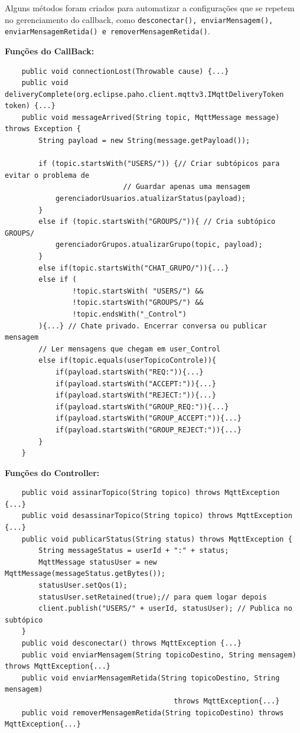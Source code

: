 \documentclass{report}
\begin{document}
Alguns métodos foram criados para automatizar a configurações que se repetem no gerenciamento do callback, como \texttt{desconectar(), enviarMensagem(), enviarMensagemRetida() e removerMensagemRetida()}.

\textbf{Funções do CallBack:}
\begin{verbatim}
	public void connectionLost(Throwable cause) {...}
	public void deliveryComplete(org.eclipse.paho.client.mqttv3.IMqttDeliveryToken token) {...}
	public void messageArrived(String topic, MqttMessage message) throws Exception {
		String payload = new String(message.getPayload());

		if (topic.startsWith("USERS/")) {// Criar subtópicos para evitar o problema de
							// Guardar apenas uma mensagem
			gerenciadorUsuarios.atualizarStatus(payload);
		}
		else if (topic.startsWith("GROUPS/")){ // Cria subtópico GROUPS/
			gerenciadorGrupos.atualizarGrupo(topic, payload);
		}
		else if(topic.startsWith("CHAT_GRUPO/")){...}
		else if (
				!topic.startsWith( "USERS/") && 
				!topic.startsWith("GROUPS/") &&
				!topic.endsWith("_Control")
		){...} // Chate privado. Encerrar conversa ou publicar mensagem
		// Ler mensagens que chegam em user_Control
		else if(topic.equals(userTopicoControle)){
			if(payload.startsWith("REQ:")){...}
			if(payload.startsWith("ACCEPT:")){...}
			if(payload.startsWith("REJECT:")){...}
			if(payload.startsWith("GROUP_REQ:")){...}
			if(payload.startsWith("GROUP_ACCEPT:")){...}
			if(payload.startsWith("GROUP_REJECT:")){...}
		}
	}
\end{verbatim}
\textbf{Funções do Controller:}
\begin{verbatim}
	public void assinarTopico(String topico) throws MqttException {...}
	public void desassinarTopico(String topico) throws MqttException {...}
	public void publicarStatus(String status) throws MqttException {
		String messageStatus = userId + ":" + status;
		MqttMessage statusUser = new MqttMessage(messageStatus.getBytes());
		statusUser.setQos(1);
		statusUser.setRetained(true);// para quem logar depois
		client.publish("USERS/" + userId, statusUser); // Publica no subtópico
	}
	public void desconectar() throws MqttException {...}
	public void enviarMensagem(String topicoDestino, String mensagem) throws MqttException{...}
	public void enviarMensagemRetida(String topicoDestino, String mensagem) 
										throws MqttException{...}
	public void removerMensagemRetida(String topicoDestino) throws MqttException{...}
\end{verbatim}
\end{document}
